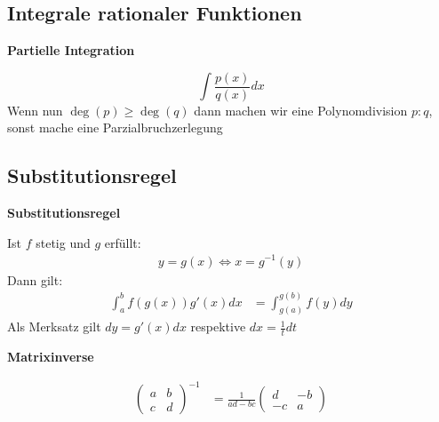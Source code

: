 \documentclass{sciposter}
\newenvironment{method}[1]{\begin{mdframed}[backgroundcolor=blue!10,innertopmargin=15pt, innerbottommargin=15pt, nobreak=true]
		\textbf{#1 }
	}
	{ 
	\end{mdframed}
}
\newcommand{\psection}[1]{\par \textbf{\large#1}}
\begin{document}
\begin{multicols}{2}
\subsection*{Integrale rationaler Funktionen}
\begin{method}{Partielle Integration}
	$$\int \frac{p(x)}{q(x)} dx$$
	Wenn nun $\deg(p) \geq \deg(q)$ dann machen wir eine Polynomdivision $p:q$, sonst mache eine Parzialbruchzerlegung
\end{method}

\subsection*{Substitutionsregel}
\begin{method}{Substitutionsregel}
	Ist $f$ stetig und $g$ erfüllt:
	\begin{align*}
	y = g(x) \iff x = g^{-1}(y)
	\end{align*}
	Dann gilt:
	\begin{align*}
	\int_a ^b f(g(x))g'(x) dx &= \int_{g(a)}^{g(b)} f(y) dy
	\end{align*}
	Als Merksatz gilt $dy = g'(x) dx$ respektive $dx = \frac{1}{t} dt$
\end{method}


\psection{Matrixinverse}

\begin{align*}
	\begin{pmatrix}
	a & b \\ c & d 
	\end{pmatrix} ^{-1} &= \frac{1}{ad-bc} 	\begin{pmatrix}
d & -b \\ -c & a
	\end{pmatrix}
\end{align*}



\vfill\null
\columnbreak



\end{multicols}
\end{document}
